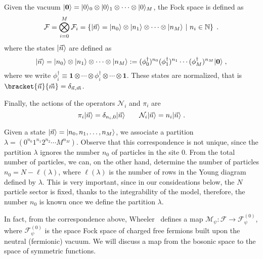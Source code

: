 \documentclass[a4paper,11pt]{amsart}
\begin{document}
Given the vacuum \(\lvert\bm{0}\rangle = \lvert0\rangle_0\otimes \lvert0\rangle_1
\otimes \cdots \otimes  \lvert0\rangle_M\),
the Fock space is defined as 
\begin{equation}
  \mathcal{F} = \bigotimes_{i=0}^M \mathcal{F}_i = 
  \left\{\lvert\vec{n}\rangle = \lvert n_0\rangle\otimes \lvert n_1\rangle \otimes \cdots
  \otimes \lvert n_M\rangle \ | \ n_i \in \mathbb{N} \right\}\; .
\end{equation}
where the states \(\lvert\vec{n}\rangle\) are defined as 
\begin{equation}
  \lvert\vec{n}\rangle = \lvert n_0\rangle\otimes \lvert n_1\rangle \otimes \cdots \otimes \lvert n_M\rangle 
 : =  (\phi_0^\dagger)^{n_0} (\phi_1^\dagger)^{n_1} \cdots  (\phi_M^\dagger)^{n_M} \lvert\bm{0}\rangle \; ,
\end{equation}
where we write \(\phi_i^\dagger \equiv \bm{1} \otimes  \cdots \otimes
\phi_i^\dagger \otimes \cdots \otimes \bm{1}\).
These states are normalized, that is
\(\bracket{\vec{n}}{\vec{m}}=\delta_{\vec{n}, \vec{m}}\). 

Finally, the actions of the operators \(\mathcal{N}_i\) and \(\pi_i\) are
\begin{equation}
    \pi_i\lvert\vec{n}\rangle  = \delta_{n_i, 0} \lvert\vec{n}\rangle \qquad 
    \mathcal{N}_i\lvert\vec{n}\rangle = n_i \lvert\vec{n}\rangle\; .
\end{equation}
 
Given a state \(\lvert\vec{n}\rangle = \lvert n_0, n_1, \dots, n_M\rangle\), we
associate a partition \( \lambda = (0^{n_0} 1^{n_1} 2^{n_2} \cdots
M^{n_M})\). Observe that this correspondence is not unique, since the
partition \(\lambda\) ignores the number \(n_0\) of particles in the
site \(0\). From the total number of particles, we can, on the other hand,
determine the number of particles \(n_0 = N - \ell(\lambda)\), where
\(\ell(\lambda)\) is the number of rows in the Young diagram defined
by \(\lambda\). This is very important, since in our consideations 
below, the \(N\) particle sector is fixed, thanks to the integrability of 
the model, therefore, the number \(n_0\) is known once we define the 
partition \(\lambda\). 

In fact, from the correspondence above, Wheeler~\cite{Wheeler:2010vmq}
defines a map \(\mathcal{M}_\psi: \mathcal{F}\to
\mathcal{F}^{(0)}_\psi\), where \(\mathcal{F}^{(0)}_\psi\) is the
space Fock space of charged free fermions built upon the neutral
(fermionic) vacuum. We will discuss a map from the bosonic space to
the space of symmetric functions.
\end{document}
